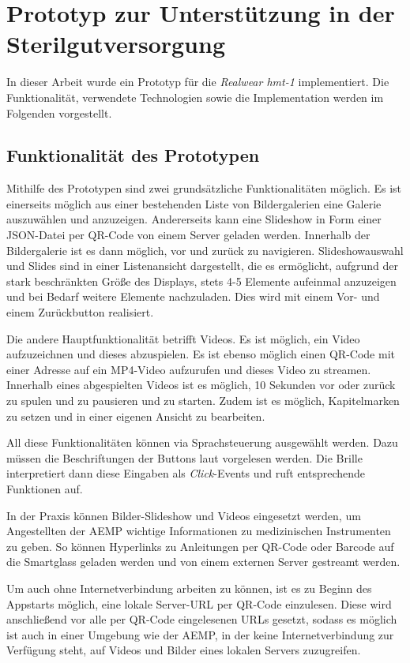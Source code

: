%
%
%
%
%
%
\chapter{Prototyp zur Unterstützung in der Sterilgutversorgung}
\label{ch:Prototyp}
In dieser Arbeit wurde ein Prototyp für die \emph{Realwear hmt-1} implementiert. Die Funktionalität, verwendete Technologien sowie die Implementation werden im Folgenden vorgestellt.
%
%
\section{Funktionalität des Prototypen}
Mithilfe des Prototypen sind zwei grundsätzliche Funktionalitäten möglich. Es ist einerseits möglich aus einer bestehenden Liste von Bildergalerien eine Galerie auszuwählen und anzuzeigen. Andererseits kann eine Slideshow in Form einer JSON-Datei per QR-Code von einem Server geladen werden. Innerhalb der Bildergalerie ist es dann möglich, vor und zurück zu navigieren. Slideshowauswahl und Slides sind in einer Listenansicht dargestellt, die es ermöglicht, aufgrund der stark beschränkten Größe des Displays, stets 4-5 Elemente aufeinmal anzuzeigen und bei Bedarf weitere Elemente nachzuladen. Dies wird mit einem Vor- und einem Zurückbutton realisiert.

Die andere Hauptfunktionalität betrifft Videos. Es ist möglich, ein Video aufzuzeichnen und dieses abzuspielen. Es ist ebenso möglich einen QR-Code mit einer Adresse auf ein MP4-Video aufzurufen und dieses Video zu streamen. Innerhalb eines abgespielten Videos ist es möglich, 10 Sekunden vor oder zurück zu spulen und zu pausieren und zu starten. Zudem ist es möglich, Kapitelmarken zu setzen und in einer eigenen Ansicht zu bearbeiten.

All diese Funktionalitäten können via Sprachsteuerung ausgewählt werden. Dazu müssen die Beschriftungen der Buttons laut vorgelesen werden. Die Brille interpretiert dann diese Eingaben als \emph{Click}-Events und ruft entsprechende Funktionen auf.

In der Praxis können Bilder-Slideshow und Videos eingesetzt werden, um Angestellten der AEMP wichtige Informationen zu medizinischen Instrumenten zu geben. So können Hyperlinks zu Anleitungen per QR-Code oder Barcode auf die Smartglass geladen werden und von einem externen Server gestreamt werden.

Um auch ohne Internetverbindung arbeiten zu können, ist es zu Beginn des Appstarts möglich, eine lokale Server-URL per QR-Code einzulesen. Diese wird anschließend vor alle per QR-Code eingelesenen URLs gesetzt, sodass es möglich ist auch in einer Umgebung wie der AEMP, in der keine Internetverbindung zur Verfügung steht, auf Videos und Bilder eines lokalen Servers zuzugreifen. 

